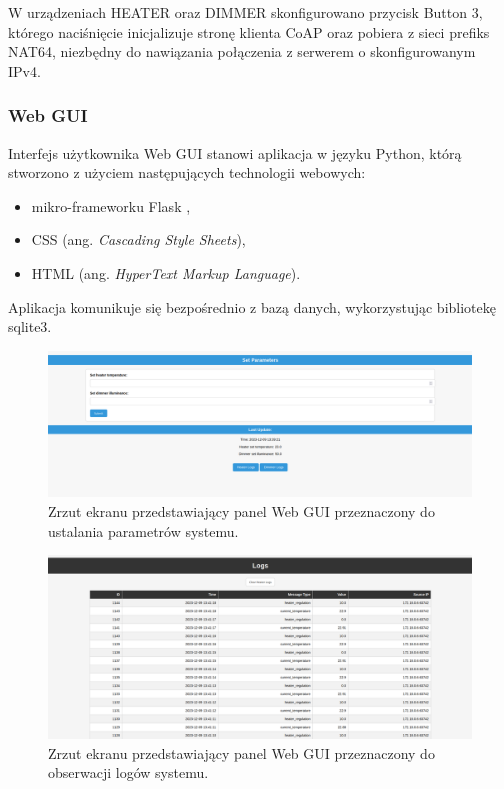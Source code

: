             W urządzeniach HEATER oraz DIMMER skonfigurowano przycisk Button 3, którego naciśnięcie inicjalizuje stronę klienta CoAP oraz pobiera z sieci prefiks NAT64, niezbędny do nawiązania połączenia z serwerem o skonfigurowanym IPv4.
        
        \subsubsection{Web GUI}

            Interfejs użytkownika Web GUI stanowi aplikacja w języku Python, którą stworzono z użyciem następujących technologii webowych:
            \begin{itemize}
                \item mikro-frameworku Flask \cite{flask},
                \item CSS (ang. \textit{Cascading Style Sheets}),
                \item HTML (ang. \textit{HyperText Markup Language}).
            \end{itemize}
            Aplikacja komunikuje się bezpośrednio z bazą danych, wykorzystując bibliotekę sqlite3.

            \begin{figure}[H]
                \centering
                \includegraphics[width=0.8\linewidth]{graphics/screenshots/web-gui-set-parameters.png}
                \caption{Zrzut ekranu przedstawiający panel Web GUI przeznaczony do ustalania parametrów systemu.}
                \label{fig:web-gui-set-parameters}
            \end{figure}

            \begin{figure}[H]
                \centering
                \includegraphics[width=0.8\linewidth]{graphics/screenshots/web-gui-logs.png}
                \caption{Zrzut ekranu przedstawiający panel Web GUI przeznaczony do obserwacji logów systemu.}
                \label{fig:web-gui-logs}
            \end{figure}

